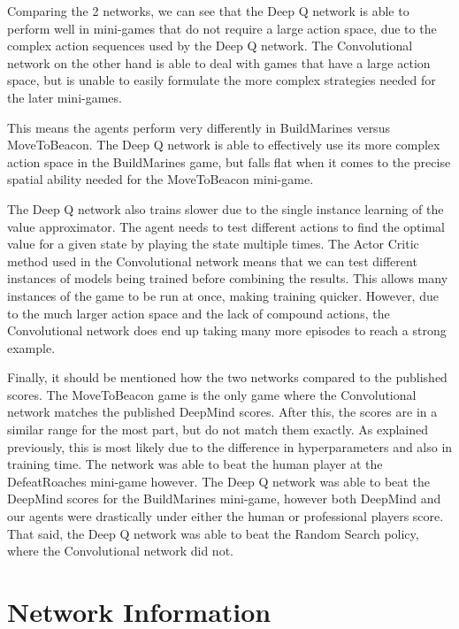 Comparing the 2 networks, we can see that the Deep Q network is able to perform
well in mini-games that do not require a large action space, due to the complex
action sequences used by the Deep Q network. The Convolutional network on the
other hand is able to deal with games that have a large action space, but is
unable to easily formulate the more complex strategies needed for the later
mini-games.

This means the agents perform very differently in BuildMarines versus MoveToBeacon.
The Deep Q network is able to effectively use its more complex action space in
the BuildMarines game, but falls flat when it comes to the precise spatial
ability needed for the MoveToBeacon mini-game.

The Deep Q network also trains slower due to the single instance learning of the
value approximator. The agent needs to test different actions to find the
optimal value for a given state by playing the state multiple times. The Actor
Critic method used in the Convolutional network means that we can test different
instances of models being trained before combining the results. This allows many
instances of the game to be run at once, making training quicker. However, due
to the much larger action space and the lack of compound actions, the
Convolutional network does end up taking many more episodes to reach a strong
example.

Finally, it should be mentioned how the two networks compared to the published
scores. The MoveToBeacon game is the only game where the Convolutional network
matches the published DeepMind scores. After this, the scores are in a similar
range for the most part, but do not match them exactly. As explained previously,
this is most likely due to the difference in hyperparameters and also in
training time. The network was able to beat the human player at the
DefeatRoaches mini-game however. The Deep Q network was able to beat the
DeepMind scores for the BuildMarines mini-game, however both DeepMind and our
agents were drastically under either the human or professional players score.
That said, the Deep Q network was able to beat the Random Search policy, where
the Convolutional network did not.

\section{Network Information}

